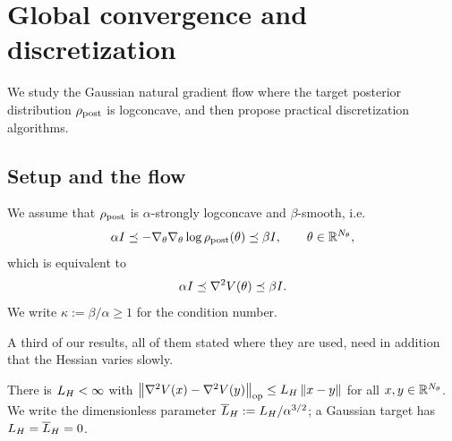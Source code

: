 \section{Global convergence and discretization}
\label{sec:global}

We study the Gaussian natural gradient flow where the target posterior distribution
$\rho_{\mathrm{post}}$ is logconcave, and then propose practical discretization algorithms.

\subsection{Setup and the flow}

\begin{assumption}\label{assump:logconcave-smooth}
    We assume that $\rho_{\mathrm{post}}$ is $\alpha$-strongly logconcave and $\beta$-smooth, i.e.
    \begin{equation*}
        \alpha I \preceq -\nabla_\theta \nabla_\theta \log \rho_{\mathrm{post}} (\theta) \preceq \beta I,
        \qquad \theta\in\mathbb{R}^{N_\theta},
    \end{equation*}
    which is equivalent to
    \begin{equation*}
        \alpha I \preceq \nabla^2 V(\theta) \preceq \beta I .
    \end{equation*}
    We write $\kappa := \beta/\alpha \geq 1$ for the condition number.
\end{assumption}

A third of our results, all of them stated where they are used, need in addition that the
Hessian varies slowly.

\begin{assumption}
\label{assump:hess-lip}
There is $L_H<\infty$ with $\left\lVert \nabla^2V(x)-\nabla^2V(y)\right\rVert_{\mathrm{op}}\leq L_H\left\lVert x-y\right\rVert$ for all
$x,y\in\mathbb{R}^{N_\theta}$. We write the dimensionless parameter $\overline{L}_H:=L_H/\alpha^{3/2}$; a Gaussian
target has $L_H=\overline{L}_H=0$.
\end{assumption}

